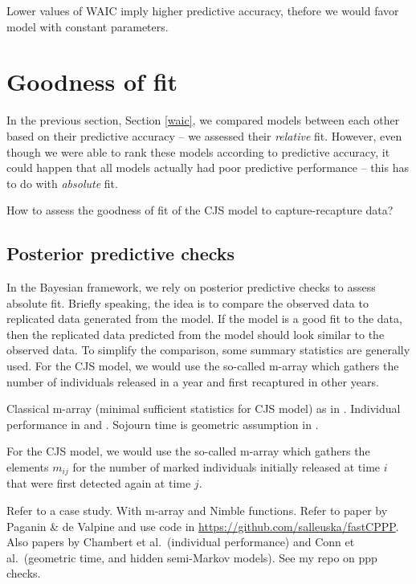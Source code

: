 \documentclass[
  12pt,
]{krantz}
\begin{document}
Lower values of WAIC imply higher predictive accuracy, thefore we would favor model with constant parameters.

\section{Goodness of fit}\label{gof}

In the previous section, Section \ref{waic}, we compared models between each other based on their predictive accuracy -- we assessed their \emph{relative} fit. However, even though we were able to rank these models according to predictive accuracy, it could happen that all models actually had poor predictive performance -- this has to do with \emph{absolute} fit.

How to assess the goodness of fit of the CJS model to capture-recapture data?

\subsection{Posterior predictive checks}\label{posterior-predictive-checks}

In the Bayesian framework, we rely on posterior predictive checks to assess absolute fit. Briefly speaking, the idea is to compare the observed data to replicated data generated from the model. If the model is a good fit to the data, then the replicated data predicted from the model should look similar to the observed data. To simplify the comparison, some summary statistics are generally used. For the CJS model, we would use the so-called m-array which gathers the number of individuals released in a year and first recaptured in other years.

Classical m-array (minimal sufficient statistics for CJS model) as in \citet{paganin2023computational}. Individual performance in \citet{chambert2014} and \citet{nater2020trout}. Sojourn time is geometric assumption in \citet{conn2018}.

For the CJS model, we would use the so-called m-array which gathers the elements \(m_{ij}\) for the number of marked individuals initially released at time \(i\) that were first detected again at time \(j\).

Refer to a case study. With m-array and Nimble functions. Refer to paper by Paganin \& de Valpine and use code in \url{https://github.com/salleuska/fastCPPP}. Also papers by Chambert et al.~(individual performance) and Conn et al.~(geometric time, and hidden semi-Markov models). See my repo on ppp checks.
\end{document}
